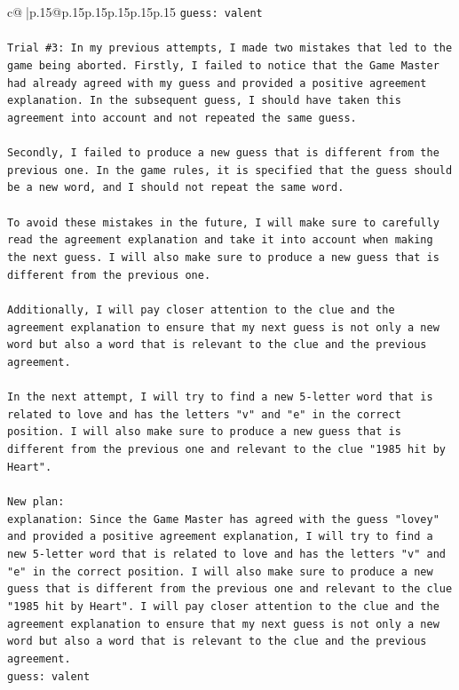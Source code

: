 \documentclass{article}
\begin{document}
{\begin{supertabular}{c@{$\;$}|p{.15\linewidth}@{}p{.15\linewidth}p{.15\linewidth}p{.15\linewidth}p{.15\linewidth}p{.15\linewidth}}
{{{\texttt{guess: valent} \\
\\ 
\texttt{Trial \#3: In my previous attempts, I made two mistakes that led to the game being aborted. Firstly, I failed to notice that the Game Master had already agreed with my guess and provided a positive agreement explanation. In the subsequent guess, I should have taken this agreement into account and not repeated the same guess. } \\
\\ 
\texttt{Secondly, I failed to produce a new guess that is different from the previous one. In the game rules, it is specified that the guess should be a new word, and I should not repeat the same word. } \\
\\ 
\texttt{To avoid these mistakes in the future, I will make sure to carefully read the agreement explanation and take it into account when making the next guess. I will also make sure to produce a new guess that is different from the previous one. } \\
\\ 
\texttt{Additionally, I will pay closer attention to the clue and the agreement explanation to ensure that my next guess is not only a new word but also a word that is relevant to the clue and the previous agreement. } \\
\\ 
\texttt{In the next attempt, I will try to find a new 5{-}letter word that is related to love and has the letters "v" and "e" in the correct position. I will also make sure to produce a new guess that is different from the previous one and relevant to the clue "1985 hit by Heart".} \\
\\ 
\texttt{New plan: } \\
\texttt{explanation: Since the Game Master has agreed with the guess "lovey" and provided a positive agreement explanation, I will try to find a new 5{-}letter word that is related to love and has the letters "v" and "e" in the correct position. I will also make sure to produce a new guess that is different from the previous one and relevant to the clue "1985 hit by Heart". I will pay closer attention to the clue and the agreement explanation to ensure that my next guess is not only a new word but also a word that is relevant to the clue and the previous agreement. } \\
\texttt{guess: valent} \\
\\ 
}}}
\end{supertabular}}
\end{document}
